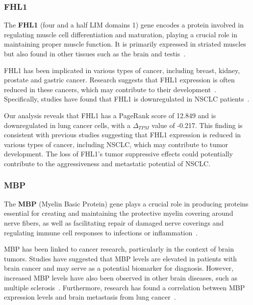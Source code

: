 \subsubsection*{FHL1} \label{subsubsec:fhl1}
The \textbf{FHL1} (four and a half LIM domains 1) gene encodes a protein
involved in regulating muscle cell differentiation and maturation,
playing a crucial role in maintaining proper muscle function.
It is primarily expressed in striated muscles but also found in other tissues such as the brain and testis~\cite{Storey2020FHL1}.

FHL1 has been implicated in various types of cancer, including breast, kidney, prostate and gastric cancer.
Research suggests that FHL1 expression is often reduced in these cancers,
which may contribute to their development~\cite{Li2008FHL1, Sakashita2008FHL1}.
Specifically, studies have found that FHL1 is downregulated in NSCLC patients~\cite{Niu2012FHL1}.

Our analysis reveals that FHL1 has a PageRank score of 12.849 and is downregulated in lung cancer cells,
with a $\Delta_{TPM}$ value of -0.217.
This finding is consistent with previous studies suggesting that FHL1 expression is reduced in various types of cancer,
including NSCLC, which may contribute to tumor development.
The loss of FHL1's tumor suppressive effects could potentially contribute to the aggressiveness and metastatic potential of NSCLC.
\newline

\subsubsection*{MBP} \label{subsubsec:mbp}
The \textbf{MBP} (Myelin Basic Protein) gene plays a crucial role in producing proteins essential for creating and
maintaining the protective myelin covering around nerve fibers, as well as
facilitating repair of damaged nerve coverings and regulating immune cell responses to infections or inflammation~\cite{Nye1995MBP}.

MBP has been linked to cancer research, particularly in the context of brain tumors.
Studies have suggested that MBP levels are elevated in patients with brain cancer and may serve as a potential biomarker for diagnosis.
However, increased MBP levels have also been observed in other brain diseases, such as multiple sclerosis~\cite{Zavialova2017MBP}.
Furthermore, research has found a correlation between MBP expression levels and brain metastasis from lung cancer~\cite{Nakagawa1994MBP}.

